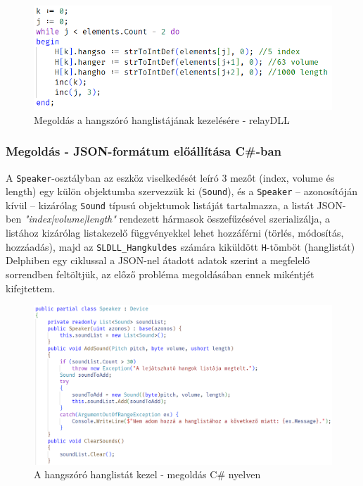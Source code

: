 \documentclass[tocnopagenum]{thesis-ekf}
\begin{document}
	\begin{figure}[H]
		\centering
		\includegraphics[scale=0.8]{speaker_solved}
		\caption{Megoldás a hangszóró hanglistájának kezelésére - relayDLL}
		\label{speaker_solved}
	\end{figure}

	\subsubsection{Megoldás - JSON-formátum előállítása C\#-ban}
	A \verb*|Speaker|-osztályban az eszköz viselkedését leíró 3 mezőt (index, volume és length) egy külön objektumba szervezzük ki (\verb*|Sound|), és a \verb*|Speaker| -- azonosítóján kívül -- kizárólag \verb*|Sound| típusú objektumok listáját tartalmazza, a listát JSON-ben \textit{"index|volume|length"} rendezett hármasok összefűzésével szerializálja, a listához kizárólag listakezelő függvényekkel lehet hozzáférni (törlés, módosítás, hozzáadás), majd az \verb*|SLDLL_Hangkuldes| számára kiküldött \verb*|H|-tömböt (hanglistát) Delphiben egy ciklussal a JSON-nel átadott adatok szerint a megfelelő sorrendben feltöltjük, az előző probléma megoldásában ennek mikéntjét kifejtettem.
	\begin{figure}[H]
		\centering
		\includegraphics[scale=0.53]{speaker_csharp}
		\caption{A hangszóró hanglistát kezel - megoldás C\# nyelven}
		\label{speaker_csharp}
	\end{figure}
\end{document}
